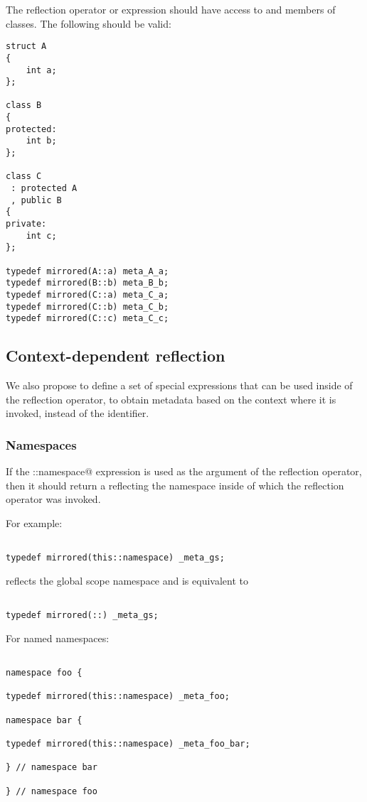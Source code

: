 The reflection operator or expression should have access to \verb@private@ and
\verb@protected@ members of classes. The following should be valid:

\begin{verbatim}
struct A
{
	int a;
};

class B
{
protected:
	int b;
};

class C
 : protected A
 , public B
{
private:
	int c;
};

typedef mirrored(A::a) meta_A_a;
typedef mirrored(B::b) meta_B_b;
typedef mirrored(C::a) meta_C_a;
typedef mirrored(C::b) meta_C_b;
typedef mirrored(C::c) meta_C_c;

\end{verbatim}

\subsection{Context-dependent reflection}
\label{section-context-dependent-reflection}

We also propose to define a set of special expressions that can be used
inside of the reflection operator, to obtain metadata based on the context
where it is invoked, instead of the identifier.

\subsubsection{Namespaces}

If the \verb@this::namespace@ expression is used as the argument of the reflection
operator, then it should return a  reflecting the namespace
inside of which the reflection operator was invoked.

For example:

\begin{verbatim}

typedef mirrored(this::namespace) _meta_gs;

\end{verbatim}

reflects the global scope namespace and is equivalent to

\begin{verbatim}

typedef mirrored(::) _meta_gs;

\end{verbatim}

For named namespaces:

\begin{verbatim}

namespace foo {

typedef mirrored(this::namespace) _meta_foo;

namespace bar {

typedef mirrored(this::namespace) _meta_foo_bar;

} // namespace bar

} // namespace foo
\end{verbatim}

